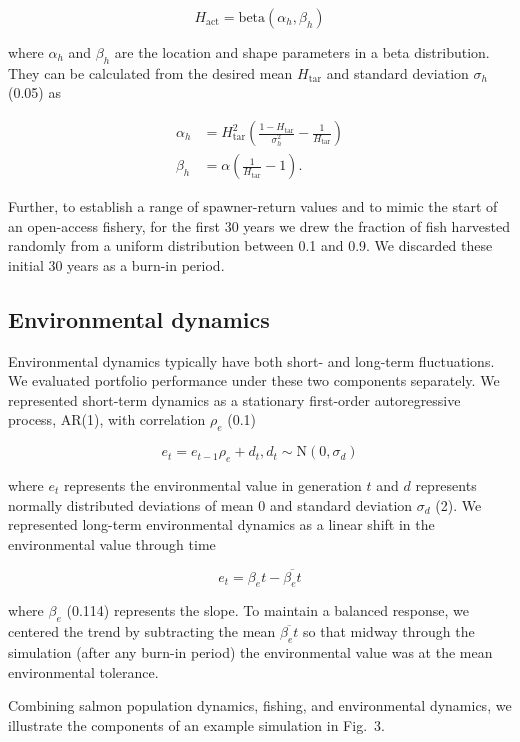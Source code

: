 \[H_{\mathrm{act}} = \mathrm{beta}(\alpha_h, \beta_h)\]

\noindent where $\alpha_h$ and $\beta_h$ are the location and shape parameters in a beta distribution. They can be calculated from the desired mean $H_{\mathrm{tar}}$ and standard deviation $\sigma_h$ (0.05) as \citep[p.~97]{morgan1990}

\[\begin{aligned}
  \alpha_h &= H_{\mathrm{tar}}^2
                \left(
                \frac{1 - H_{\mathrm{tar}}}{\sigma_h^2} - \frac{1}{H_{\mathrm{tar}}}
                \right)\\
   \beta_h &= \alpha \left({\frac{1}{H_{\mathrm{tar}}} - 1}\right).\end{aligned}\]

\noindent Further, to establish a range of spawner-return values and to mimic the start of an open-access fishery, for the first 30 years we drew the fraction of fish harvested randomly from a uniform distribution between 0.1 and 0.9. We discarded these initial 30 years as a burn-in period.

\subsection{Environmental dynamics}

Environmental dynamics typically have both short- and long-term fluctuations. We evaluated portfolio performance under these two components separately. We represented short-term dynamics as a stationary first-order autoregressive process, AR(1), with correlation $\rho_e$ (0.1)

\[e_t = e_{t-1} \rho_e + d_t, d_t \sim \mathrm{N}(0, \sigma_d)\]

\noindent where $e_t$ represents the environmental value in generation $t$ and $d$ represents normally distributed deviations of mean 0 and standard deviation $\sigma_d$ (2). We represented long-term environmental dynamics as a linear shift in the environmental value through time

\[e_t = \beta_e t - \overline{\beta_e t}\]

\noindent where $\beta_e$ (0.114) represents the slope. To maintain a balanced response, we centered the trend by subtracting the mean $\overline{\beta_e t}$ so that midway through the simulation (after any burn-in period) the environmental value was at the mean environmental tolerance.

Combining salmon population dynamics, fishing, and environmental dynamics, we illustrate the components of an example simulation in Fig.~3.

